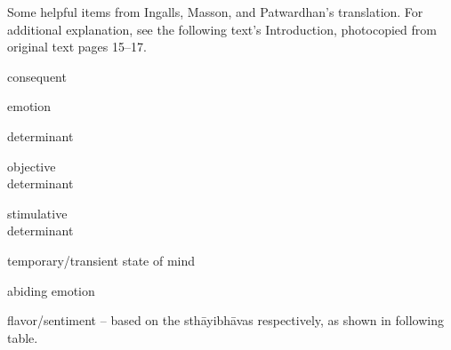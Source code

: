 \documentclass{article}
\begin{document}
Some helpful items from Ingalls, Masson, and Patwardhan's translation. For additional explanation, see the following text's Introduction, photocopied from original text pages 15--17.
\vspace{-6pt}
\begin{multicols}{2}
	\begin{description}
		\setlength{\itemsep}{-0.2em}

		\item[anubhāva] consequent
		\item[bhāva] emotion
		\item[vibhāva] determinant

		      \vspace{-6pt}
		      \begin{description}[
				      itemindent=-3em
			      ]
			      \setlength{\itemsep}{-0.2em}
			      \item[ālambanavibhāva] objective \\ determinant
			      \item[uddīpanavibhāva] stimulative \\ determinant
		      \end{description}

		      \vspace{-4pt}
		\item[vyabhicārin/vyabhicāribhāva] temporary/transient state of mind

		\item[sthāyibhāva] abiding emotion

		\item[rasa] flavor/sentiment -- based on the sthāyibhāvas respectively, as shown in following table.

	\end{description}
\end{multicols}
\end{document}
